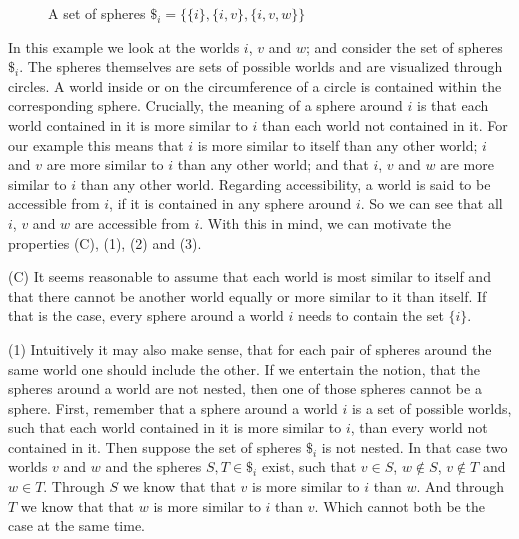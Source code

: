 \documentclass[a4paper,american,10pt]{paper}
\theoremstyle{definition}\newtheorem{definition}{Definition}
\begin{document}
\begin{figure}[H]
\centering
{}
\caption{A set of spheres $\$_i=\{\{ i\} ,\{ i,v\} ,\{ i,v,w\}\}$}
\label{fig:set_of_spheres}
\end{figure}

\noindent In this example we look at the worlds $i$, $v$ and $w$; and consider the set of spheres $\$_i$. The spheres themselves are sets of possible worlds and are visualized through circles. A world inside or on the circumference of a circle is contained within the corresponding sphere. Crucially, the meaning of a sphere around $i$ is that each world contained in it is more similar to $i$ than each world not contained in it. For our example this means that $i$ is more similar to itself than any other world; $i$ and $v$ are more similar to $i$ than any other world; and that $i$, $v$ and $w$ are more similar to $i$ than any other world. Regarding accessibility, a world is said to be accessible from $i$, if it is contained in any sphere around $i$. So we can see that all $i$, $v$ and $w$ are accessible from $i$. With this in mind, we can motivate the properties (C), (1), (2) and (3).

(C) It seems reasonable to assume that each world is most similar to itself and that there cannot be another world equally or more similar to it than itself. If that is the case, every sphere around a world $i$ needs to contain the set $\{ i\}$.

(1) Intuitively it may also make sense, that for each pair of spheres around the same world one should include the other. If we entertain the notion, that the spheres around a world are not nested, then one of those spheres cannot be a sphere. First, remember that a sphere around a world $i$ is a set of possible worlds, such that each world contained in it is more similar to $i$, than every world not contained in it. Then suppose the set of spheres $\$_i$ is not nested. In that case two worlds $v$ and $w$ and the spheres $S,T\in\$_i$ exist, such that $v\in S$, $w\notin S$, $v\notin T$ and $w\in T$. Through $S$ we know that that $v$ is more similar to $i$ than $w$. And through $T$ we know that that $w$ is more similar to $i$ than $v$. Which cannot both be the case at the same time.
\end{document}
